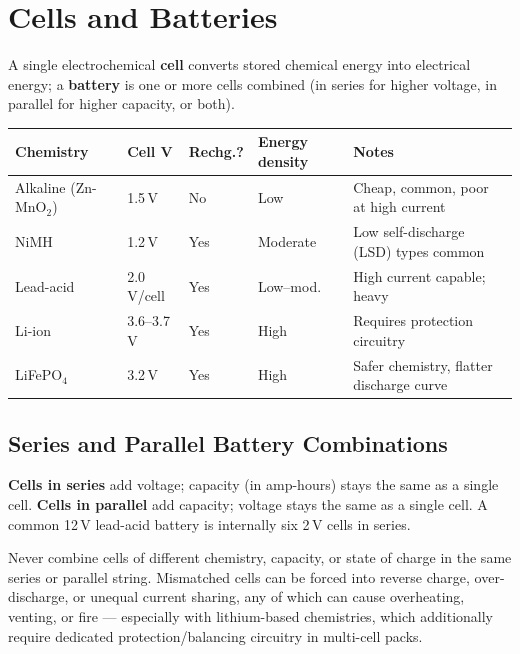 \section{Cells and Batteries}

A single electrochemical \textbf{cell} converts stored chemical energy
into electrical energy; a \textbf{battery} is one or more cells combined
(in series for higher voltage, in parallel for higher capacity, or both).

\begin{center}
\renewcommand{\arraystretch}{1.2}
\begin{tabularx}{\linewidth}{@{}l l l l Y@{}}
\toprule
Chemistry & Cell V & Rechg.? & Energy density & Notes \\
\midrule
Alkaline (Zn-MnO$_2$) & 1.5\,V & No & Low & Cheap, common, poor at high current \\
NiMH & 1.2\,V & Yes & Moderate & Low self-discharge (LSD) types common \\
Lead-acid & 2.0\,V/cell & Yes & Low--mod. & High current capable; heavy \\
Li-ion & 3.6--3.7\,V & Yes & High & Requires protection circuitry \\
LiFePO$_4$ & 3.2\,V & Yes & High & Safer chemistry, flatter discharge curve \\
\bottomrule
\end{tabularx}
\end{center}

\subsection{Series and Parallel Battery Combinations}

\begin{keyidea}
\textbf{Cells in series} add voltage; capacity (in amp-hours) stays the
same as a single cell. \textbf{Cells in parallel} add capacity; voltage
stays the same as a single cell. A common 12\,V lead-acid battery is
internally six 2\,V cells in series.
\end{keyidea}

\begin{safetynote}
Never combine cells of different chemistry, capacity, or state of charge
in the same series or parallel string. Mismatched cells can be forced
into reverse charge, over-discharge, or unequal current sharing, any of
which can cause overheating, venting, or fire --- especially with
lithium-based chemistries, which additionally require dedicated
protection/balancing circuitry in multi-cell packs.
\end{safetynote}


